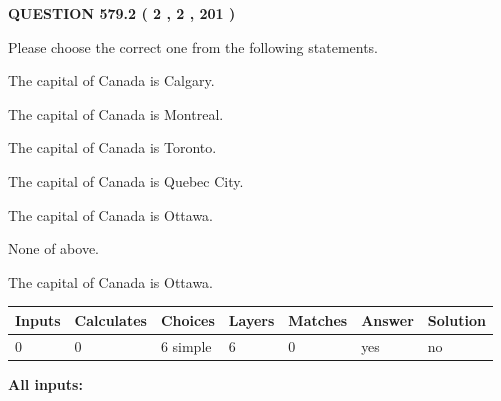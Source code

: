 \documentclass[12pt]{article}
\begin{document}
   
  
\vspace{0.2in}
  
{\textbf{\Large{QUESTION
579.2 
 ( 2 , 2 , 201 )
}}}
  
  
Please choose the correct one from the following statements.
 
 
The capital of Canada is Calgary.
 
 
The capital of Canada is Montreal.
 
 
The capital of Canada is Toronto.
 
 
The capital of Canada is Quebec City.
 
 
The capital of Canada is Ottawa.
 
 
 None of above.
 
 
\noindent{}
 
 
The capital of Canada is Ottawa.
 
 
\noindent{}
 
 
   
   
   
   
\noindent\begin{tabular}{|l|l|l|l|l|l|l|}
 \hline
Inputs & Calculates & Choices & Layers & Matches & Answer & Solution \\ \hline
 0  & 
 0  & 
 6
  simple  
  & 
 6  & 
 0  & 
  yes & 
  no 
  \\ \hline
 \end{tabular}
   
   
   
   
\noindent{}
   
   
   
   
\noindent\vspace{0.1in}\hspace{-0.08in} {\textbf{\Large{All inputs: }}}
   
   
   
   
   
   
 \vspace{0.2in}
 
   
   
\end{document}
